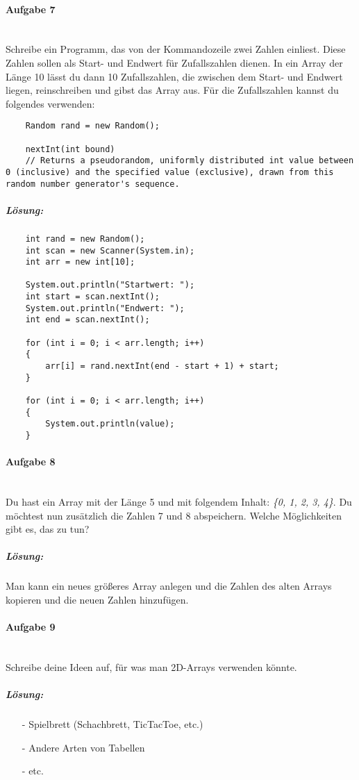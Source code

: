 \documentclass[12pt,a4paper,ngerman]{scrartcl}
\begin{document}
	\newpage
	
	\paragraph{Aufgabe 7}\mbox{}\\
	Schreibe ein Programm, das von der Kommandozeile zwei Zahlen einliest. Diese Zahlen sollen als Start- und Endwert für Zufallszahlen dienen. In ein Array der Länge 10 lässt du dann 10 Zufallszahlen, die zwischen dem Start- und Endwert liegen, reinschreiben und gibst das Array aus.
	Für die Zufallszahlen kannst du folgendes verwenden:
	
	\begin{lstlisting}
	Random rand = new Random();
	
	nextInt(int bound)
	// Returns a pseudorandom, uniformly distributed int value between 0 (inclusive) and the specified value (exclusive), drawn from this random number generator's sequence.
	\end{lstlisting}
	
	\subparagraph{Lösung:}\mbox{}
	\begin{lstlisting}
	int rand = new Random();
	int scan = new Scanner(System.in);
	int arr = new int[10];
	
	System.out.println("Startwert: ");
	int start = scan.nextInt();
	System.out.println("Endwert: ");
	int end = scan.nextInt();
	
	for (int i = 0; i < arr.length; i++)
	{
		arr[i] = rand.nextInt(end - start + 1) + start;
	}
	
	for (int i = 0; i < arr.length; i++)
	{
		System.out.println(value);
	}
	\end{lstlisting}
	
	\paragraph{Aufgabe 8}\mbox{}\\
	Du hast ein Array mit der Länge 5 und mit folgendem Inhalt: \emph{\{0, 1, 2, 3, 4\}}. Du möchtest nun zusätzlich die Zahlen 7 und 8 abspeichern. Welche Möglichkeiten gibt es, das zu tun?
	
	\subparagraph{Lösung:}
	Man kann ein neues größeres Array anlegen und die Zahlen des alten Arrays kopieren und die neuen Zahlen hinzufügen.
	
	\paragraph{Aufgabe 9}\mbox{}\\
	Schreibe deine Ideen auf, für was man 2D-Arrays verwenden könnte.
	
	\subparagraph{Lösung:} 
	\begin{itemize}
		\item[-] Spielbrett (Schachbrett, TicTacToe, etc.)
		\item[-] Andere Arten von Tabellen
		\item[-] etc.
	\end{itemize}
\end{document}
